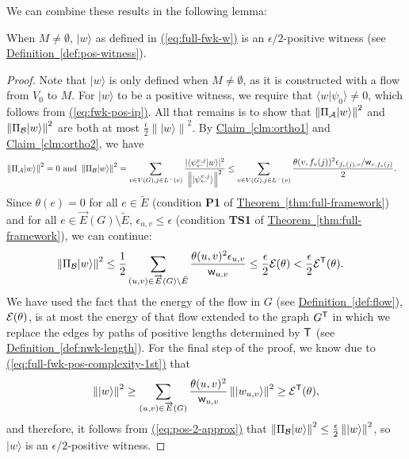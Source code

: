\documentclass{article}
\newcommand{\eq}[1]{\hyperref[eq:#1]{(\ref*{eq:#1})}}
\newcommand{\thm}[1]{\hyperref[thm:#1]{Theorem~\ref*{thm:#1}}}
\newcommand{\defin}[1]{\hyperref[def:#1]{Definition~\ref*{def:#1}}}
\newcommand{\clm}[1]{\hyperref[clm:#1]{Claim~\ref*{clm:#1}}}
\def\ket#1{{\lvert}#1\rangle}
\renewcommand{\>}{\rangle}
\newcommand{\<}{\langle}
\renewcommand{\(}{\left(}
\renewcommand{\)}{\right)}
\def\braket#1#2{{{\langle}#1\vert}#2\rangle}
\def\norm#1{\left\| #1 \right\|}
\def\w{{\sf w}}
\begin{document}
\noindent We can combine these results in the following lemma:
\begin{lemma}\label{lem:full-fwk-pos-2}
When $M\neq\emptyset$, $\ket{w}$ as defined in \eq{full-fwk-w} is an $\epsilon/2$-positive witness (see \defin{pos-witness}).
\end{lemma}
\begin{proof}
Note that $\ket{w}$ is only defined when $M\neq \emptyset$, as it is constructed with a flow from $V_0$ to $M$.
For $\ket{w}$ to be a positive witness, we require that $\braket{w}{\psi_0}\neq 0$, which follows from \eq{fwk-pos-ip}. All that remains is to show that $\norm{\Pi_{\cal A}\ket{w}}^2$ and $\norm{\Pi_{\cal B}\ket{w}}^2$ are both at most $\frac{\epsilon}{2}\norm{\ket{w}}^2$. 
By \clm{ortho1} and \clm{ortho2}, we have 
\begin{align*}
\norm{\Pi_{\cal A}\ket{w}}^2=0
\mbox{ and }
\norm{\Pi_{\cal B}\ket{w}}^2 &= \sum_{v\in V(G),j\in L^-(v)}\frac{|\braket{\psi_{\leftarrow}^{v,j}}{w}|^2}{\norm{\ket{\psi_{\leftarrow}^{v,j}}}^2}
\leq \sum_{v\in V(G),j\in L^-(v)}\frac{\theta(v,f_v(j))^2 \epsilon_{f_v(j),v}/\w_{v,f_v(j)}}{2}.
\end{align*}
Since $\theta(e)=0$ for all $e\in \tilde{E}$ (condition \textbf{P1} of \thm{full-framework}) and for all $e\in \overrightarrow{E}(G)\setminus\tilde{E}$, $\epsilon_{u,v}\leq \epsilon$ (condition \textbf{TS1} of \thm{full-framework}), we can continue:
\begin{align}
\norm{\Pi_{\cal B}\ket{w}}^2 &\leq \frac{1}{2}\sum_{(u,v)\in\overrightarrow{E}(G)\setminus \tilde{E}}\frac{\theta(u,v)^2 \epsilon_{u,v}}{\w_{u,v}}
\leq \frac{\epsilon}{2}{\cal E}(\theta) < \frac{\epsilon}{2}{\cal E}^{\sf T}(\theta). \label{eq:pos-2-approx}
\end{align}
We have used the fact that the energy of the flow in $G$ (see \defin{flow}), ${\cal E}(\theta)$, is at most
the energy of that flow extended to the graph $G^{\sf T}$ in which we replace the edges by paths of positive lengths determined by ${\sf T}$ (see \defin{nwk-length}). For the final step of the proof, we know due to \eq{full-fwk-pos-complexity-1st} that
\begin{align*}
	\norm{\ket{w}}^2 \geq \sum_{(u,v)\in\overrightarrow{E}(G)}\frac{\theta(u,v)^2}{\w_{u,v}}\norm{\ket{w_{u,v}}}^2 \geq {\cal E}^{\sf T}(\theta), 
\end{align*}
and therefore, it follows from \eq{pos-2-approx} that $\norm{\Pi_{\cal B}\ket{w}}^2\leq \frac{\epsilon}{2}\norm{\ket{w}}^2$, so $\ket{w}$ is an $\epsilon/2$-positive witness.
\end{proof}
\end{document}
